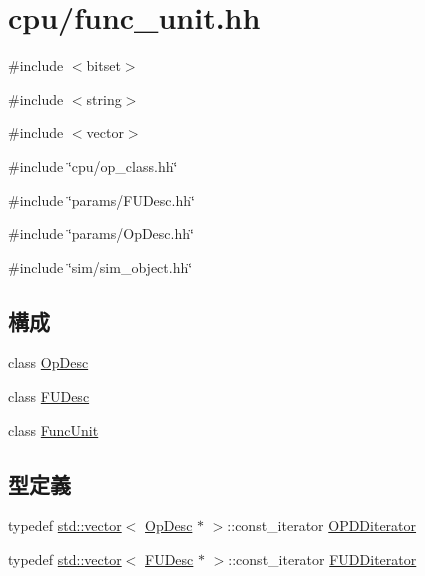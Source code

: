\hypertarget{func__unit_8hh}{
\section{cpu/func\_\-unit.hh}
\label{func__unit_8hh}
}
{\ttfamily \#include $<$bitset$>$}\par
{\ttfamily \#include $<$string$>$}\par
{\ttfamily \#include $<$vector$>$}\par
{\ttfamily \#include \char`\"{}cpu/op\_\-class.hh\char`\"{}}\par
{\ttfamily \#include \char`\"{}params/FUDesc.hh\char`\"{}}\par
{\ttfamily \#include \char`\"{}params/OpDesc.hh\char`\"{}}\par
{\ttfamily \#include \char`\"{}sim/sim\_\-object.hh\char`\"{}}\par
\subsection*{構成}
\begin{DoxyCompactItemize}
\item 
class \hyperlink{classOpDesc}{OpDesc}
\item 
class \hyperlink{classFUDesc}{FUDesc}
\item 
class \hyperlink{classFuncUnit}{FuncUnit}
\end{DoxyCompactItemize}
\subsection*{型定義}
\begin{DoxyCompactItemize}
\item 
typedef \hyperlink{classstd_1_1vector}{std::vector}$<$ \hyperlink{classOpDesc}{OpDesc} $\ast$ $>$::const\_\-iterator \hyperlink{func__unit_8hh_a7c8030986ef4945661cc7c73e2cb54ad}{OPDDiterator}
\item 
typedef \hyperlink{classstd_1_1vector}{std::vector}$<$ \hyperlink{classFUDesc}{FUDesc} $\ast$ $>$::const\_\-iterator \hyperlink{func__unit_8hh_a4feb205c35c8717d4fbce7db6f79bbca}{FUDDiterator}
\end{DoxyCompactItemize}


